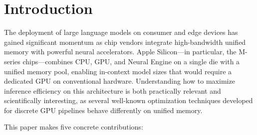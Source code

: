 \documentclass[11pt,a4paper]{article}
\begin{document}
\tableofcontents
\newpage

\section{Introduction}

The deployment of large language models on consumer and edge devices has gained
significant momentum as chip vendors integrate high-bandwidth unified memory
with powerful neural accelerators.
Apple Silicon---in particular, the M-series chips---combines CPU, GPU, and Neural
Engine on a single die with a unified memory pool, enabling in-context model
sizes that would require a dedicated GPU on conventional hardware.
Understanding how to maximize inference efficiency on this architecture is both
practically relevant and scientifically interesting, as several well-known
optimization techniques developed for discrete GPU pipelines behave differently
on unified memory.

This paper makes five concrete contributions:
\end{document}

